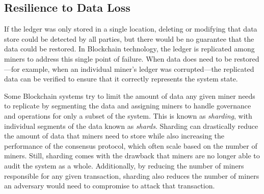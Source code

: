 \subsection{Resilience to Data Loss}
If the ledger was only stored in a single location, deleting or modifying that data store could be detected by all parties, but there would be no guarantee that the data could be restored.
In Blockchain technology, the ledger is replicated among miners to address this single point of failure.
When data does need to be restored---for example, when an individual miner's ledger was corrupted---the replicated data can be verified to ensure that it correctly represents the system state.



Some Blockchain systems try to limit the amount of data any given miner needs to replicate by segmenting the data and assigning miners to handle governance and operations for only a subset of the system.
This is known as \emph{sharding}, with individual segments of the data known as \emph{shards}.
Sharding can drastically reduce the amount of data that miners need to store while also increasing the performance of the consensus protocol, which often scale based on the number of miners.
Still, sharding comes with the drawback that miners are no longer able to audit the system as a whole.
Additionally, by reducing the number of miners responsible for any given transaction, sharding also reduces the number of miners an adversary would need to compromise to attack that transaction.


